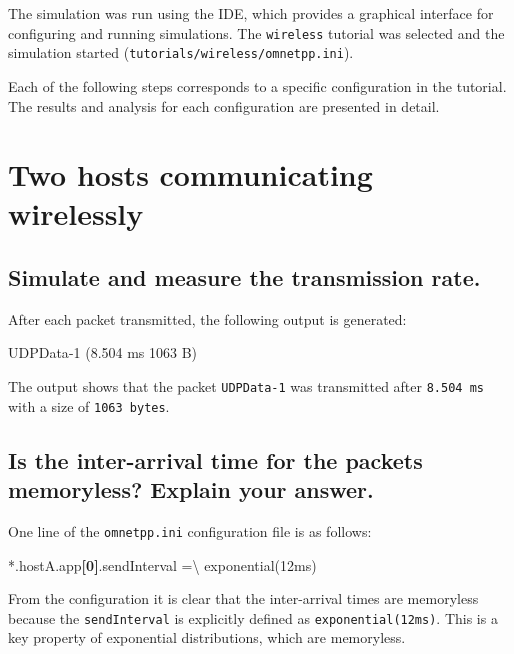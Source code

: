 \documentclass[
  letterpaper,
  DIV=11,
  numbers=noendperiod]{scrartcl}
\newenvironment{Shaded}{\begin{snugshade}}{\end{snugshade}}
\newcommand{\DataTypeTok}[1]{\textcolor[rgb]{0.68,0.00,0.00}{#1}}
\newcommand{\KeywordTok}[1]{\textcolor[rgb]{0.00,0.23,0.31}{\textbf{#1}}}
\newcommand{\NormalTok}[1]{\textcolor[rgb]{0.00,0.23,0.31}{#1}}
\newcommand{\OtherTok}[1]{\textcolor[rgb]{0.00,0.23,0.31}{#1}}
\newcommand{\StringTok}[1]{\textcolor[rgb]{0.13,0.47,0.30}{#1}}
\begin{document}
The simulation was run using the IDE, which provides a graphical
interface for configuring and running simulations. The \texttt{wireless}
tutorial was selected and the simulation started
(\texttt{tutorials/wireless/omnetpp.ini}).

Each of the following steps corresponds to a specific configuration in
the tutorial. The results and analysis for each configuration are
presented in detail.

\section{Two hosts communicating
wirelessly}\label{two-hosts-communicating-wirelessly}

\subsection{Simulate and measure the transmission
rate.}\label{simulate-and-measure-the-transmission-rate.}

After each packet transmitted, the following output is generated:

\begin{Shaded}
\begin{Highlighting}[]
\NormalTok{UDPData{-}1 (8.504 ms 1063 B)}
\end{Highlighting}
\end{Shaded}

The output shows that the packet \texttt{UDPData-1} was transmitted
after \texttt{8.504\ ms} with a size of \texttt{1063\ bytes}.

\subsection{Is the inter-arrival time for the packets memoryless?
Explain your
answer.}\label{is-the-inter-arrival-time-for-the-packets-memoryless-explain-your-answer.}

One line of the \texttt{omnetpp.ini} configuration file is as follows:

\begin{Shaded}
\begin{Highlighting}[]
\DataTypeTok{*.hostA.app}\KeywordTok{[0]}\DataTypeTok{.sendInterval }\OtherTok{=}\StringTok{\textbackslash{}}
\DataTypeTok{  exponential(12ms)}
\end{Highlighting}
\end{Shaded}

From the configuration it is clear that the inter-arrival times are
memoryless because the \texttt{sendInterval} is explicitly defined as
\texttt{exponential(12ms)}. This is a key property of exponential
distributions, which are memoryless.
\end{document}
